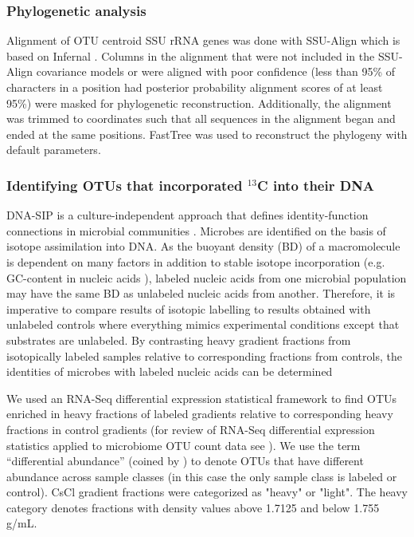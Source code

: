 \documentclass{article}
\begin{document}
\subsubsection{Phylogenetic analysis}
Alignment of OTU centroid SSU rRNA genes was done with SSU-Align which is based on Infernal
\citep{Nawrocki_2013,Nawrocki_2009}. Columns in the alignment that were not included in
the SSU-Align covariance models or were aligned with poor confidence (less than
95\% of characters in a position had posterior probability alignment scores of
at least 95\%) were masked for phylogenetic reconstruction. Additionally, the
alignment was trimmed to coordinates such that all sequences in the alignment
began and ended at the same positions. FastTree \citep{Price_2009} was used to
reconstruct the phylogeny with default parameters.

\subsubsection{Identifying OTUs that incorporated $^{13}$C into their DNA}\label{fc}
DNA-SIP is a culture-independent approach that defines identity-function
connections in microbial communities
\citep{Buckley_2011,Neufeld_2007,Radajewski_2003}. Microbes are identified on
the basis of isotope assimilation into DNA. As the buoyant density (BD) of
a macromolecule is dependent on many factors in addition to stable isotope
incorporation (e.g. GC-content in nucleic acids \citep{Youngblut_2014}),
labeled nucleic acids from one microbial population may have the same BD as
unlabeled nucleic acids from another. Therefore, it is imperative to compare
results of isotopic labelling to results obtained with unlabeled controls where
everything mimics experimental conditions except that substrates are unlabeled.
By contrasting heavy gradient fractions from isotopically labeled samples
relative to corresponding fractions from controls, the identities of microbes
with labeled nucleic acids can be determined 

We used an RNA-Seq differential expression statistical framework
\citep{Love_2014} to find OTUs enriched in heavy fractions of labeled
gradients relative to corresponding heavy fractions in control gradients
(for review of RNA-Seq differential expression statistics applied to
microbiome OTU count data see \citep{McMurdie_2014}). We use the term
“differential abundance” (coined by \citep{McMurdie_2014}) to denote OTUs
that have different abundance across sample classes (in this case the only
sample class is labeled or control). CsCl gradient fractions were
categorized as "heavy" or "light". The heavy category denotes fractions
with density values above 1.7125 and below 1.755 g/mL. 
\end{document}
